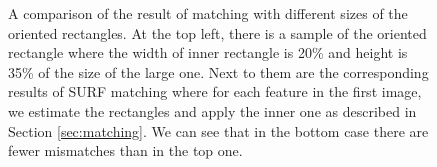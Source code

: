 \begin{figure}[H]
\caption{A comparison of the result of matching with different sizes of the oriented rectangles. 
At the top left, there is a sample of the oriented rectangle where the width of inner rectangle is 20\% and height is 35\% of the size of the large one. 
Next to them are the corresponding results of SURF matching where for each feature in the first image, we estimate the rectangles and apply the inner one as described in Section \ref{sec:matching}.
We can see that in the bottom case there are fewer mismatches than in the top one.}
\label{fig:matching_comparison}
\end{figure}


